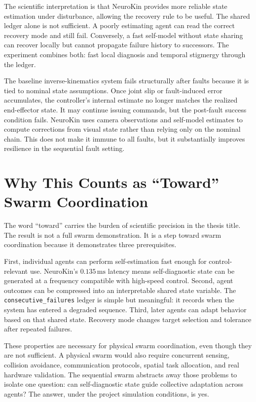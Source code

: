 \documentclass[12pt,a4paper,oneside]{report}
\begin{document}
The scientific interpretation is that NeuroKin provides more reliable state estimation under disturbance, allowing the recovery rule to be useful. The shared ledger alone is not sufficient. A poorly estimating agent can read the correct recovery mode and still fail. Conversely, a fast self-model without state sharing can recover locally but cannot propagate failure history to successors. The experiment combines both: fast local diagnosis and temporal stigmergy through the ledger.

The baseline inverse-kinematics system fails structurally after faults because it is tied to nominal state assumptions. Once joint slip or fault-induced error accumulates, the controller's internal estimate no longer matches the realized end-effector state. It may continue issuing commands, but the post-fault success condition fails. NeuroKin uses camera observations and self-model estimates to compute corrections from visual state rather than relying only on the nominal chain. This does not make it immune to all faults, but it substantially improves resilience in the sequential fault setting.

\section{Why This Counts as ``Toward'' Swarm Coordination}

The word ``toward'' carries the burden of scientific precision in the thesis title. The result is not a full swarm demonstration. It is a step toward swarm coordination because it demonstrates three prerequisites.

First, individual agents can perform self-estimation fast enough for control-relevant use. NeuroKin's $0.135\,\mathrm{ms}$ latency means self-diagnostic state can be generated at a frequency compatible with high-speed control. Second, agent outcomes can be compressed into an interpretable shared state variable. The \texttt{consecutive\_failures} ledger is simple but meaningful: it records when the system has entered a degraded sequence. Third, later agents can adapt behavior based on that shared state. Recovery mode changes target selection and tolerance after repeated failures.

These properties are necessary for physical swarm coordination, even though they are not sufficient. A physical swarm would also require concurrent sensing, collision avoidance, communication protocols, spatial task allocation, and real hardware validation. The sequential swarm abstracts away those problems to isolate one question: can self-diagnostic state guide collective adaptation across agents? The answer, under the project simulation conditions, is yes.
\end{document}
